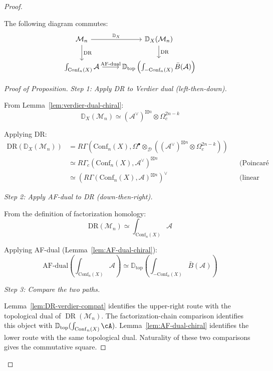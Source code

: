 \begin{proof}
\begin{proposition}\label{prop:key-compat-DR}
The following diagram commutes:
\[
\begin{tikzcd}
\mathcal{M}_n \arrow[r, "\mathbb{D}_X"] \arrow[d, "\text{DR}"]
& \mathbb{D}_X(\mathcal{M}_n) \arrow[d, "\text{DR}"] \\
\int_{\text{Conf}_n(X)} \mathcal{A} \arrow[r, "\text{AF-dual}"]
& \mathbb{D}_{\text{top}}\left(\int_{-\text{Conf}_n(X)} \bar{B}(\mathcal{A})\right)
\end{tikzcd}
\]
\end{proposition}

\begin{proof}[Proof of Proposition]
\emph{Step 1: Apply DR to Verdier dual (left-then-down).}

From Lemma~\ref{lem:verdier-dual-chiral}:
\[\mathbb{D}_X(\mathcal{M}_n) \simeq (\mathcal{A}^\vee)^{\boxtimes n} \otimes \Omega^{2n-k}_c\]

Applying DR:
\begin{align*}
\text{DR}(\mathbb{D}_X(\mathcal{M}_n))
&= R\Gamma(\text{Conf}_n(X), \Omega^\bullet \otimes_{\mathcal{D}} ((\mathcal{A}^\vee)^{\boxtimes n} \otimes \Omega^{2n-k}_c)) \\
&\simeq R\Gamma_c(\text{Conf}_n(X), \mathcal{A}^\vee)^{\boxtimes n} && \text{(Poincaré duality)} \\
&\simeq \left(R\Gamma(\text{Conf}_n(X), \mathcal{A})^{\boxtimes n}\right)^\vee && \text{(linear duality)}
\end{align*}

\emph{Step 2: Apply AF-dual to DR (down-then-right).}

From the definition of factorization homology:
\[\text{DR}(\mathcal{M}_n) \simeq \int_{\text{Conf}_n(X)} \mathcal{A}\]

Applying AF-dual (Lemma~\ref{lem:AF-dual-chiral}):
\[\text{AF-dual}\left(\int_{\text{Conf}_n(X)} \mathcal{A}\right) \simeq \mathbb{D}_{\text{top}}\left(\int_{-\text{Conf}_n(X)} \bar{B}(\mathcal{A})\right)\]

\emph{Step 3: Compare the two paths.}

Lemma~\ref{lem:DR-verdier-compat} identifies the upper-right route
with the topological dual of
$\operatorname{DR}(\mathcal M_n)$.  The factorization-chain
comparison identifies this object with
$\mathbb D_{\mathrm{top}}(\int_{\operatorname{Conf}_n(X)}\cA)$.
Lemma~\ref{lem:AF-dual-chiral} identifies the lower route with the
same topological dual.  Naturality of these two comparisons gives the
commutative square. \qedhere
\end{proof}


\end{proof}
